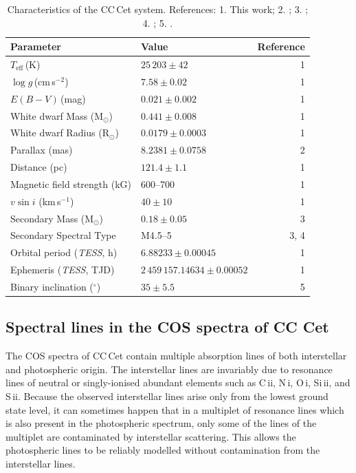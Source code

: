 \documentclass[fleqn,usenatbib]{mnras}
\newcommand{\Msun}{\mbox{$\mathrm{M}_{\odot}$}}
\newcommand{\Rsun}{\mbox{$\mathrm{R}_{\odot}$}}
\begin{document}
\begin{table} 
\setlength{\tabcolsep}{4pt} %
\centering 
\caption{Characteristics of the CC\,Cet system. 
References: 1. This work; 2. \citet{gaia18-1}; 3. \citet{safferetal93-1}; 4. \citet{tappertetal07-2}; 5. \citet{somersetal96-2}.}
\begin{tabular}{llr}
\hline
Parameter & Value & Reference \\
\hline 
$T_{\mathrm{eff}}$\,(K)           & $25\,203\pm42$              & 1\\
$\log g$\,(cm\,s$^{-2}$)          &  $7.58\pm0.02$            & 1\\
$E(B-V)$\,(mag)                   & $0.021\pm0.002$           & 1\\
White dwarf Mass (\Msun)          & $0.441\pm0.008$           & 1\\
White dwarf Radius (\Rsun)        & $0.0179\pm0.0003$         & 1\\
Parallax (mas)                    & $8.2381\pm0.0758$         & 2 \\
Distance (pc)                     & $121.4\pm1.1$             & 1\\
Magnetic field strength (kG)      & 600--700                  & 1 \\
$v \sin i$ (km\,s$^{-1}$)         & $40\pm10$                 & 1\\
Secondary Mass (\Msun)            & $0.18\pm0.05$             & 3\\
Secondary Spectral Type           & M4.5--5                   & 3, 4 \\ 
Orbital period (\textit{TESS}, h) & $6.88233\pm0.00045$        & 1\\
Ephemeris (\textit{TESS}, TJD)   & $2\,459\,157.14634\pm0.00052$ & 1 \\
Binary inclination ($^{\circ}$)   & $35\pm5.5$                & 5 \\

\hline
\end{tabular} 
\label{tab:characteristics} 
\end{table} 

\subsection{Spectral lines in the COS spectra of CC Cet}

The COS spectra of CC\,Cet contain multiple absorption lines of both interstellar and photospheric origin. The interstellar lines are invariably due to resonance lines of neutral or singly-ionised abundant elements such as C\,{\sc ii}, N\,{\sc i}, O\,{\sc i}, Si\,{\sc ii}, and S\,{\sc ii}. Because the observed interstellar lines arise only from the lowest ground state level, it can sometimes happen that in a multiplet of resonance lines which is also present in the photospheric spectrum, only some of the lines of the multiplet are contaminated by interstellar scattering. This allows the photospheric lines to be reliably modelled without contamination from the interstellar lines. 
\end{document}
